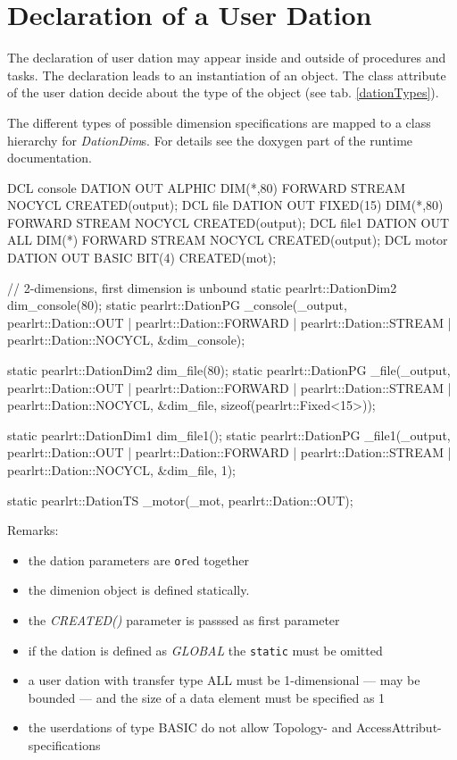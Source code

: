 \section{Declaration of a User Dation}
The declaration of user dation may appear inside and outside of procedures and 
tasks.
The declaration leads to an instantiation of an object. 
The class attribute of the user dation decide about the type of the object
(see tab. \ref{dationTypes}).

The different types of possible dimension specifications are mapped to
a class hierarchy for {\em DationDim}s. For details see the doxygen part 
of the runtime documentation.

\begin{PEARLCode}
DCL console DATION OUT ALPHIC DIM(*,80) FORWARD STREAM NOCYCL CREATED(output);
DCL file DATION OUT FIXED(15) DIM(*,80) FORWARD STREAM NOCYCL CREATED(output);
DCL file1 DATION OUT ALL DIM(*) FORWARD STREAM NOCYCL CREATED(output);
DCL motor DATION OUT BASIC BIT(4) CREATED(mot);
\end{PEARLCode}

\begin{CppCode} 
// 2-dimensions, first dimension is unbound
static pearlrt::DationDim2 dim_console(80);
static pearlrt::DationPG _console(_output, 
                pearlrt::Dation::OUT      |
                pearlrt::Dation::FORWARD  | 
                pearlrt::Dation::STREAM   |
                pearlrt::Dation::NOCYCL,
                &dim_console);

static pearlrt::DationDim2 dim_file(80);
static pearlrt::DationPG _file(_output, 
                pearlrt::Dation::OUT      |
                pearlrt::Dation::FORWARD  | 
                pearlrt::Dation::STREAM   |
                pearlrt::Dation::NOCYCL,
                &dim_file, sizeof(pearlrt::Fixed<15>));

static pearlrt::DationDim1 dim_file1();
static pearlrt::DationPG _file1(_output, 
                pearlrt::Dation::OUT      |
                pearlrt::Dation::FORWARD  | 
                pearlrt::Dation::STREAM   |
                pearlrt::Dation::NOCYCL,
                &dim_file, 1);

static pearlrt::DationTS _motor(_mot,
                pearlrt::Dation::OUT);
\end{CppCode}

Remarks:
\begin{itemize}
\item the dation parameters are \verb|or|ed together
\item the dimenion object is defined statically.
\item the {\em CREATED()} parameter is passsed as first parameter
\item if the dation is defined as {\em GLOBAL} the \verb|static| must
  be omitted
\item a user dation with transfer type ALL must be 1-dimensional --- may
be bounded --- and the size of a data element must be specified as 1
\item the userdations of type BASIC do not allow Topology- and 
AccessAttribut-specifications 
\end{itemize}

